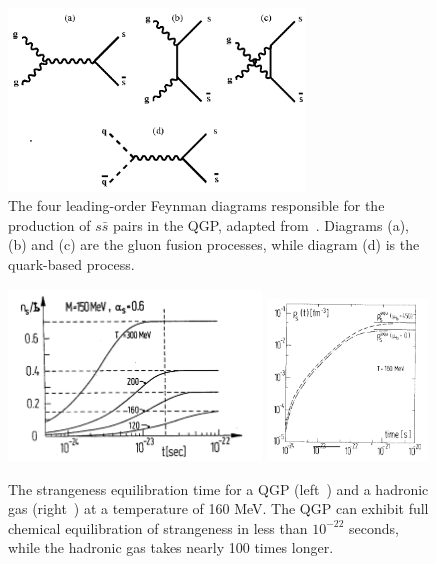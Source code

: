 \begin{figure}[ht]
    \centering
    \includegraphics[width=0.7\textwidth]{figures/introduction/ssbar_production.png}
    \caption{The four leading-order Feynman diagrams responsible for the production of $s\bar{s}$ pairs in the QGP, adapted from~\cite{Strangeness}. Diagrams (a), (b) and (c) are the gluon fusion processes, while diagram (d) is the quark-based process.}
    \label{fig:ssbar_production}
\end{figure}

\begin{figure}
    \centering
    \includegraphics[width=0.6\textwidth]{figures/introduction/plasma_equil.png}
    \includegraphics[width=0.38\textwidth]{figures/introduction/hadron_gas_equil.png}
    \caption{The strangeness equilibration time for a QGP (left~\cite{Strangeness}) and a hadronic gas (right~\cite{Strangeness2}) at a temperature of 160 MeV. The QGP can exhibit full chemical equilibration of strangeness in less than $10^{-22}$ seconds, while the hadronic gas takes nearly 100 times longer.}
    \label{fig:qgp_equil}
\end{figure}

